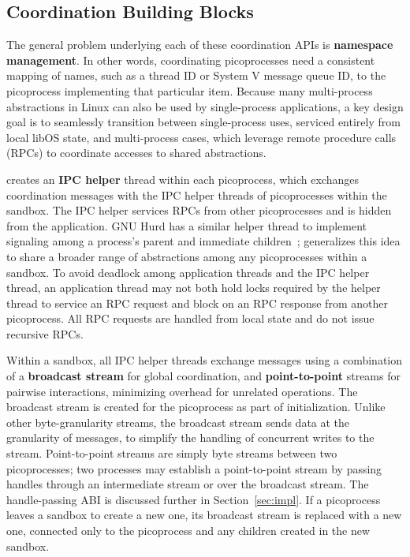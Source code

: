 \subsection{Coordination Building Blocks}
\label{sec:namespaces:blocks}

The general problem underlying each of these coordination APIs is 
{\bf namespace management}.  In other words, coordinating picoprocesses need 
a consistent mapping of names, such as a thread ID or System V message queue ID, 
to the picoprocess implementing that particular item.  
Because many multi-process abstractions in Linux can also be used by single-process applications,
a key design goal is to seamlessly transition between single-process uses, serviced 
entirely from local libOS state, and multi-process cases, which
leverage remote procedure calls (RPCs) to coordinate accesses to shared abstractions.


\sysname{} creates an  {\bf IPC helper} thread within each picoprocess,
which exchanges coordination messages with the IPC helper threads of picoprocesses 
within the sandbox. %
The IPC helper
services RPCs from other picoprocesses and is
hidden from the application. 
GNU Hurd has a similar helper thread to implement signaling among a process's parent and
immediate children~\citep{hurd};
\sysname{} generalizes this idea to share a broader range of abstractions among any picoprocesses
within a sandbox.
To avoid deadlock among application threads and the IPC helper thread, 
an application thread may not both hold locks required by the helper thread to service an RPC request
and block
on an RPC response from another picoprocess.
All RPC requests are handled from local state and do not issue recursive RPCs.%

Within a sandbox, all IPC helper threads exchange messages using a
combination of a {\bf broadcast stream} for global coordination,
and {\bf point-to-point} streams for pairwise interactions, 
minimizing overhead for unrelated operations.
The broadcast stream is created for the picoprocess as part of initialization.
Unlike other byte-granularity streams, the broadcast stream sends data at the granularity of messages,
to simplify the handling of concurrent writes to the stream.
Point-to-point streams are simply byte streams between two picoprocesses;
two processes may establish a point-to-point stream by passing handles through 
an intermediate stream or over the broadcast stream.
The handle-passing ABI is discussed further in Section~\ref{sec:impl}.
If a picoprocess leaves a sandbox to create a new one,
its broadcast stream is replaced
with a new one, connected only to the picoprocess and any children created in the
new sandbox.

